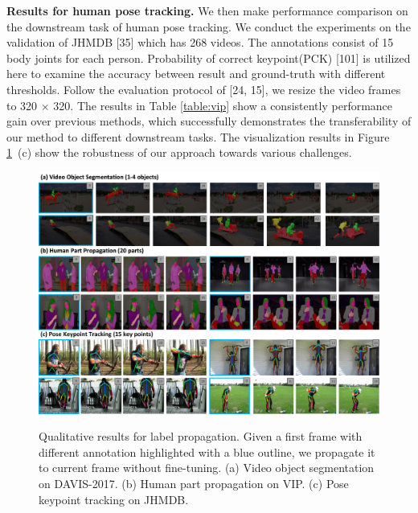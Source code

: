 \documentclass{article}
\begin{document}
  

\textbf{Results for human pose tracking.} We then make performance comparison on the downstream task of human pose tracking. We conduct the experiments on the validation of JHMDB [35] which has 268 videos.  The annotations consist of 15 body joints for each person. Probability of correct keypoint(PCK) [101] is utilized here to examine the accuracy between result and  ground-truth with different thresholds. Follow the evaluation protocol of [24, 15], we resize the video frames to 320 $\times$ 320. The results in Table \ref{table:vip} show a consistently performance gain over previous methods, which successfully demonstrates the transferability of our method to different downstream tasks. The visualization results in Figure \ref{fig:quan}~(c) show the robustness of our approach towards various challenges.


\begin{figure}[!tb]
  \centering
  {\includegraphics[width=1.0\textwidth]{figure/quantitative_results/quan.pdf}}
  \caption{\small Qualitative results for label propagation. Given a first frame with different annotation highlighted with a blue outline, we propagate it to current frame without fine-tuning. (a) Video object segmentation on DAVIS-2017. (b) Human part propagation on VIP. (c) Pose keypoint tracking on JHMDB. }
  \label{fig:quan}
  \vspace{-3mm}
\end{figure}
\end{document}
